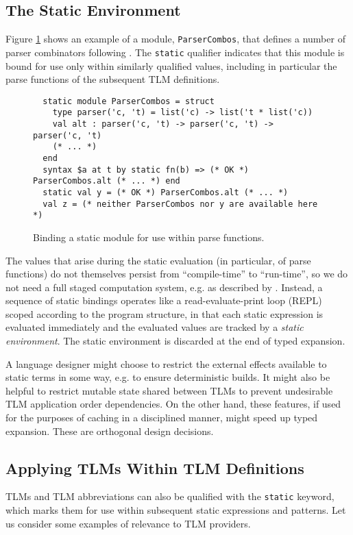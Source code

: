 \documentclass[acmsmall,10pt,review,anonymous]{acmart}\settopmatter{printfolios=true}
\newcommand{\li}[1]{\lstinline{#1}}
\begin{document}
\subsection{The Static Environment}
Figure \ref{fig:static-module-example} shows an example of a module, \li{ParserCombos}, that defines a number of parser combinators following \citet{Hutton1992d}. The \li{static} qualifier indicates that this module is bound for use only within similarly qualified values, including in particular the parse functions of the subsequent TLM definitions.
\begin{figure}[h]
\vspace{-10px}
\begin{lstlisting}
  static module ParserCombos = struct 
    type parser('c, 't) = list('c) -> list('t * list('c))
    val alt : parser('c, 't) -> parser('c, 't) -> parser('c, 't)
    (* ... *)
  end
  syntax $a at t by static fn(b) => (* OK *) ParserCombos.alt (* ... *) end 
  static val y = (* OK *) ParserCombos.alt (* ... *)
  val z = (* neither ParserCombos nor y are available here *)
\end{lstlisting}
\vspace{-5px}
\caption{Binding a static module for use within parse functions.}
\label{fig:static-module-example}
\vspace{-10px}
\end{figure}

The values that arise during the static evaluation (in particular, of parse functions) do not themselves persist from ``compile-time'' to ``run-time'', so we do not need a full staged computation system, e.g. as described by \citet{Taha99multi-stageprogramming:}. Instead, a sequence of static bindings operates like a read-evaluate-print loop (REPL) scoped according to the program structure, in that each static expression is evaluated immediately and the evaluated values are tracked by a \emph{static environment}. The static environment is discarded at the end of typed expansion.

A language designer might choose to restrict the external effects available to static terms in some way, e.g. to ensure deterministic builds. It might also be helpful to restrict mutable state shared between TLMs to prevent undesirable TLM application order dependencies. On the other hand, these features, if used for the purposes of caching in a disciplined manner, might speed up typed expansion. These are orthogonal design decisions.


\subsection{Applying TLMs Within TLM Definitions}\label{sec:tsms-for-tsms}
TLMs and TLM abbreviations can also be qualified with the \li{static} keyword, which marks them for use within subsequent static expressions and patterns. Let us consider some examples of relevance to TLM providers.
\end{document}
